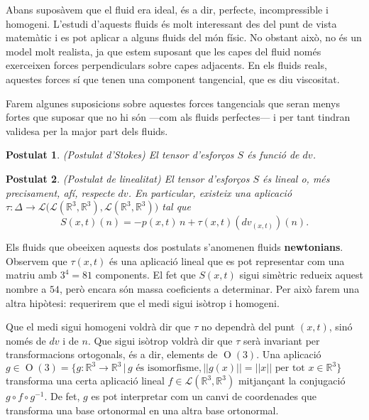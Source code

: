 \documentclass{article}
\numberwithin{equation}{section}
\DeclareMathOperator{\Or}{O}
\newtheorem{postulat}{Postulat}[section]
\begin{document}
Abans supos\`{a}vem que el fluid era ideal, \'{e}s a dir, perfecte, incompressible i homogeni. L'estudi d'aquests fluids \'{e}s molt interessant des del punt de vista matem\`{a}tic i es pot aplicar a alguns fluids del m\'{o}n f\'{i}sic. No obstant aix\`{o}, no \'{e}s un model molt realista, ja que estem suposant que les capes del fluid nom\'{e}s exerceixen forces perpendiculars sobre capes adjacents. En els fluids reals, aquestes forces s\'{i} que tenen una component tangencial, que es diu viscositat.

Farem algunes suposicions sobre aquestes forces tangencials que seran menys fortes que suposar que no hi s\'{o}n ---com als fluids perfectes--- i per tant tindran validesa per la major part dels fluids.

\begin{postulat}
(Postulat d'Stokes) El tensor d'esfor\c{c}os $S$ \'{e}s funci\'{o} de $dv$.
\end{postulat}

\begin{postulat}
(Postulat de linealitat) El tensor d'esfor\c{c}os $S$ \'{e}s lineal o, m\'{e}s precisament, af\'{i}, respecte $dv$. En particular, existeix una aplicaci\'{o} $\tau:\Delta\rightarrow\mathcal{L}\big(\mathcal{L}(\mathbb{R}^3,\mathbb{R}^3),\mathcal{L}(\mathbb{R}^3,\mathbb{R}^3)\big)$ tal que
\begin{equation}
S(x,t)(n)=-p(x,t)\,n+\tau(x,t)(dv_{(x,t)})(n).
\end{equation}
\end{postulat}

Els fluids que obeeixen aquests dos postulats s'anomenen fluids \textbf{newtonians}. Observem que $\tau(x,t)$ \'{e}s una aplicaci\'{o} lineal que es pot representar com una matriu amb $3^4=81$ components. El fet que $S(x,t)$ sigui sim\`{e}tric redueix aquest nombre a $54$, per\`{o} encara s\'{o}n massa coeficients a determinar. Per aix\`{o} farem una altra hip\`{o}tesi: requerirem que el medi sigui is\`{o}trop i homogeni.

Que el medi sigui homogeni voldr\`{a} dir que $\tau$ no dependr\`{a} del punt $(x,t)$, sin\'{o} nom\'{e}s de $dv$ i de $n$. Que sigui is\`{o}trop voldr\`{a} dir que $\tau$ ser\`{a} invariant per transformacions ortogonals, \'{e}s a dir, elements de $\Or(3)$. Una aplicaci\'{o} $g\in \Or(3)=\{g:\mathbb{R}^3\rightarrow\mathbb{R}^3\,|\,g\text{ \'{e}s isomorfisme},||g(x)||=||x||\text{ per tot }x\in\mathbb{R}^3\}$ transforma una certa aplicaci\'{o} lineal $f\in\mathcal{L}(\mathbb{R}^3,\mathbb{R}^3)$ mitjan\c{c}ant la conjugaci\'{o} $g\circ f\circ g^{-1}$. De fet, $g$ es pot interpretar com un canvi de coordenades que transforma una base ortonormal en una altra base ortonormal.
\end{document}
